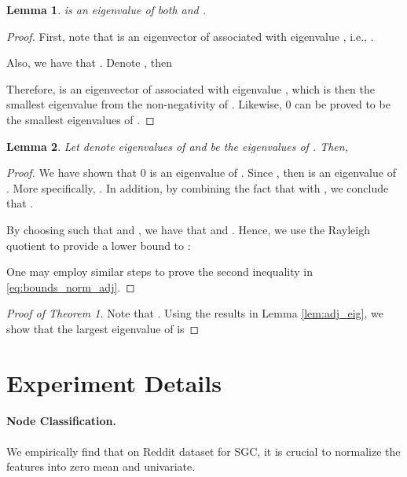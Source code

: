\documentclass{article}
\newtheorem{lemma}{Lemma}
\newcommand{\method}{SGC}
\begin{document}
\begin{lemma}
\label{lem:0_eig}
 is an eigenvalue of both  and .
\end{lemma}
\begin{proof}
First, note that  is an eigenvector of  associated with eigenvalue , i.e., .

Also, we have that . Denote , then


Therefore,  is an eigenvector of  associated with eigenvalue , which is then the smallest eigenvalue from the non-negativity of . Likewise, 0 can be proved to be the smallest eigenvalues of .
\end{proof}

\begin{lemma}
\label{lem:adj_eig}
Let  denote eigenvalues of  and  be the eigenvalues of . Then,

\end{lemma}

\begin{proof}

We have shown that 0 is an eigenvalue of . Since , then  is an eigenvalue of . More specifically, . In addition, by combining the fact that  with , we conclude that .

By choosing  such that  and , we have that  and . Hence, we use the Rayleigh quotient to provide a lower bound to :


One may employ similar steps to prove the second inequality in \autoref{eq:bounds_norm_adj}.

\end{proof}

\begin{proof} [Proof of Theorem 1] 
Note that . Using the results in Lemma \autoref{lem:adj_eig}, we show that the largest eigenvalue  of  is



\end{proof}

\section{Experiment Details}
\label{sec:exp-details}
\paragraph{Node Classification.}
We empirically find that on Reddit dataset for \method{}, it is crucial to normalize the features into zero mean and univariate. 
\end{document}
